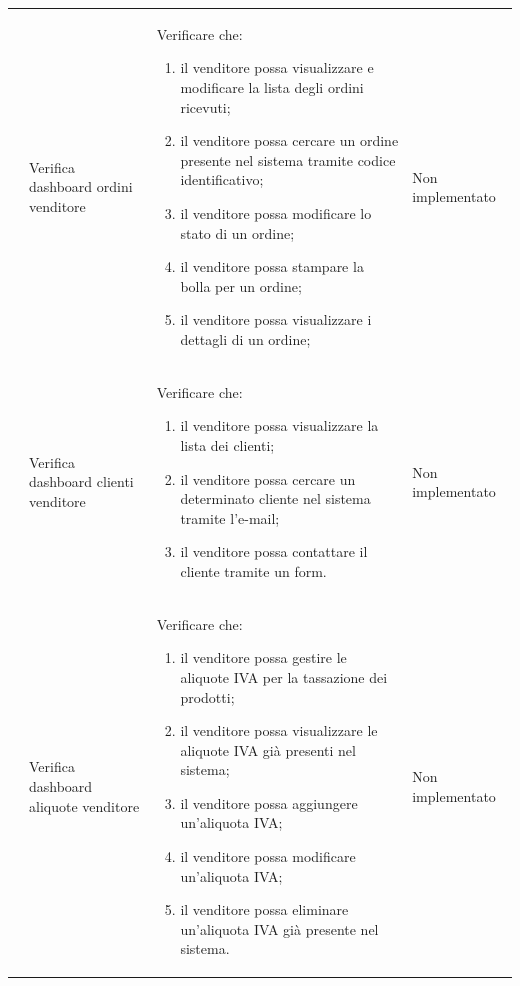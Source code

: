 \begin{center}
\begin{longtable}{|p{0.85cm}|p{2.25cm}|p{9cm}|p{3cm}|}
		 & Verifica dashboard ordini venditore & Verificare che:
		\begin{enumerate}
			\item il venditore possa visualizzare e modificare la lista degli ordini ricevuti;
			\item il venditore possa cercare un ordine presente nel sistema tramite codice identificativo;
			\item il venditore possa modificare lo stato di un ordine;
			\item il venditore possa stampare la bolla per un ordine;
			\item il venditore possa visualizzare i dettagli di un ordine;
		\end{enumerate} & Non implementato\\

		 & Verifica dashboard clienti venditore & Verificare che:
		\begin{enumerate}
			\item il venditore possa visualizzare la lista dei clienti;
			\item il venditore possa cercare un determinato cliente nel sistema tramite l'e-mail;
			\item il venditore possa contattare il cliente tramite un form.
		\end{enumerate} & Non implementato\\

		 & Verifica dashboard aliquote venditore & Verificare che:
		\begin{enumerate}
			\item il venditore possa gestire le aliquote IVA per la tassazione dei prodotti;
			\item il venditore possa visualizzare le aliquote IVA già presenti nel sistema;
			\item il venditore possa aggiungere un'aliquota IVA;
			\item il venditore possa modificare un'aliquota IVA;
			\item il venditore possa eliminare un'aliquota IVA già presente nel sistema.
		\end{enumerate}& Non implementato\\


\end{longtable}
\end{center}
